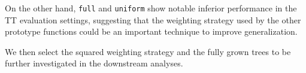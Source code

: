 On the other hand, \texttt{full} and \texttt{uniform} show notable inferior performance in the TT evaluation settings, suggesting that the weighting strategy used by the other prototype functions could be an important technique to improve generalization.



We then select the squared weighting strategy and the fully grown trees to be further investigated in the downstream analyses. %


